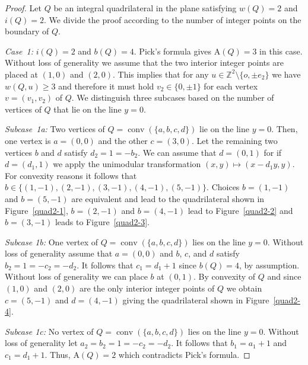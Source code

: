 \documentclass[a4paper]{article}
\theoremstyle{plain}
\begin{document}
\begin{proof}
Let $Q$ be an integral quadrilateral in the plane satisfying
$w(Q) = 2$ and $i(Q) = 2$.
We divide the proof according to the number of integer
points on the boundary of $Q$.

\emph{Case~1:}  $i(Q) = 2$ and $b(Q) = 4$.
Pick's formula gives ${\mathrm{A}}(Q) = 3$ in this case.
Without loss of generality we assume that the two interior
integer points are placed at $(1,0)$ and $(2,0)$.
This implies that for any $u \in {\mathbb{Z}}^2 \setminus \{o, \pm
e_2\}$ we have $w(Q,u) \geq 3$ and therefore it must hold
$v_2 \in \{0, \pm 1\}$ for each vertex $v = (v_1, v_2)$ of
$Q$.
We distinguish three subcases based on the number of
vertices of $Q$ that lie on the line $y = 0$.

\emph{Subcase~1a:} Two vertices of $Q = {{\mathop{\mathrm{{conv}}}}}(\{a,b,c,d\})$ lie on the
line $y = 0$.
Then, one vertex is $a = (0,0)$ and the other $c = (3,0)$.
Let the remaining two vertices $b$ and $d$ satisfy $d_2 = 1
= - b_2$.
We can assume that $d = (0,1)$ for if $d = (d_1,1)$ we apply
the unimodular transformation
$(x,y) \mapsto (x - d_1 y,y)$.
For convexity reasons it follows that $b \in \{(1,-1),
(2,-1), (3,-1), (4,-1), (5,-1)\}$.
Choices $b = (1,-1)$ and $b = (5,-1)$ are equivalent and
lead to the quadrilateral shown in Figure~\ref{quad2-1},
$b = (2,-1)$ and $b = (4,-1)$ lead to Figure~\ref{quad2-2}
and $b = (3,-1)$ leads to Figure~\ref{quad2-3}.

\emph{Subcase 1b:} One vertex of $Q = {{\mathop{\mathrm{{conv}}}}}(\{a,b,c,d\})$ lies on the
line $y = 0$. 
Without loss of generality assume that $a = (0,0)$ and
$b$, $c$, and $d$ satisfy $b_2 = 1 = - c_2 = - d_2$.
It follows that $c_1 = d_1 + 1$ since $b(Q) = 4$, by
assumption.
Without loss of generality we can place $b$ at $(0,1)$.
By convexity of $Q$ and since $(1,0)$ and $(2,0)$ are the
only interior integer points of $Q$ we obtain $c = (5,-1)$
and $d = (4,-1)$ giving the quadrilateral shown in
Figure~\ref{quad2-4}.

\emph{Subcase 1c:} No vertex of $Q = {{\mathop{\mathrm{{conv}}}}}(\{a,b,c,d\})$ lies on the line
$y = 0$.
Without loss of generality let $a_2 = b_2 = 1 = - c_2 =
- d_2$. 
It follows that $b_1 = a_1 + 1$ and $c_1 = d_1 + 1$.
Thus, ${\mathrm{A}}(Q) = 2$ which contradicts Pick's formula.


\end{proof}
\end{document}
